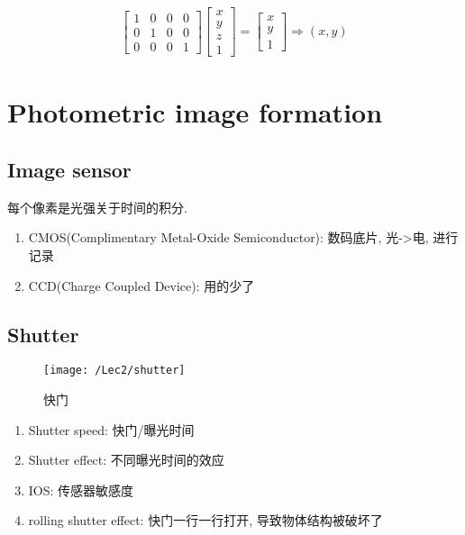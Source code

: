 \begin{align*}
    \begin{bmatrix}
        1&0&0&0\\0&1&0&0\\0&0&0&1
    \end{bmatrix}\begin{bmatrix}
        x\\y\\z\\1
    \end{bmatrix}=\begin{bmatrix}
        x\\y\\1
    \end{bmatrix}\Rightarrow (x,y)
\end{align*}

\section{Photometric image formation}

\subsection{Image sensor}
每个像素是光强关于时间的积分.
\begin{enumerate}
    \item CMOS(Complimentary Metal-Oxide
    Semiconductor): 数码底片, 光->电, 进行记录
    \item CCD(Charge Coupled Device): 用的少了
\end{enumerate}

\subsection{Shutter}
\begin{figure}[H]
    \centering
    \texttt{[image: /Lec2/shutter]}
    \caption{快门}
\end{figure}
\begin{enumerate}
    \item Shutter speed: 快门/曝光时间
    \item Shutter effect: 不同曝光时间的效应
    \item IOS: 传感器敏感度
    \item rolling shutter effect: 快门一行一行打开, 导致物体结构被破坏了
\end{enumerate}

